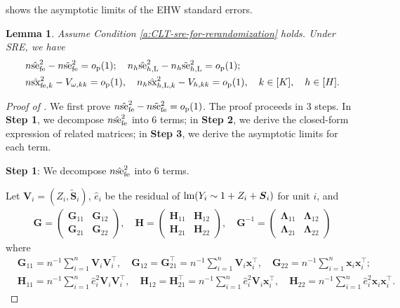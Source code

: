 \documentclass[12pt]{article}
\newtheorem{lemma}{Lemma}
\newcommand{\se}{\textnormal{se}}
\newcommand{\Lin}{\textnormal{L}}
\newcommand{\op}{o_{\textnormal{p}}}
\newcommand{\fe}{\textnormal{fe}}
\newcommand{\lm}{\textnormal{lm}}
\newcommand{\bs}{\boldsymbol}
\newcommand{\sx}{\textnormal{sx}}
\begin{document}
 shows the asymptotic limits of the EHW standard errors.
\begin{lemma}
\label{lem:limit-of-standard-errors}
Assume Condition \ref{a:CLT-sre-for-rerandomization} holds. Under SRE, we have
\begin{align*}
    &n\hat{\se}^2_{\fe } - n\tilde{\se}^2_{\fe } = \op(1);\quad  n_h\hat{\se}^2_{h,\Lin} - n_h\tilde{\se}^2_{h,\Lin} = \op(1); \\
    & n \hat{\sx}_{\fe ,k}^2 - V_{\omega,kk} = \op(1), \quad n_h \hat{\sx}_{h,\Lin,k}^2- V_{h,kk} = \op(1), \quad k \in [K],\quad h \in [H].\\
\end{align*}
\end{lemma}

\begin{proof}[Proof of ]
We first prove $n\hat{\se}^2_{\fe } - n\tilde{\se}^2_{\fe } = \op(1)$. The proof proceeds in $3$ steps. In \textbf{Step 1}, we decompose  $n\hat{\se}^2_{\fe }$ into $6$ terms;  in \textbf{Step 2}, we derive the closed-form expression of related matrices; in \textbf{Step 3}, we derive the asymptotic limits for each term.

\noindent \textbf{Step 1}: We decompose  $n\hat{\se}^2_{\fe }$ into $6$ terms.

    Let $\bs{V}_i = (Z_i,\tilde{\bs{S}}_i)$, $\hat{e}_i$ be the residual of $\lm(Y_i\sim 1+ Z_i + \bs{S}_i)$ for  unit $i$, and 
\begin{align*}
    \bs{G} = \begin{pmatrix}
        \bs{G}_{11} & \bs{G}_{12}\\
        \bs{G}_{21} & \bs{G}_{22}
    \end{pmatrix}, \quad \bs{H} = \begin{pmatrix}
        \bs{H}_{11} & \bs{H}_{12}\\
        \bs{H}_{21} & \bs{H}_{22}
    \end{pmatrix}, \quad \bs{G}^{-1} = \begin{pmatrix}
        \bs{\Lambda}_{11} & \bs{\Lambda}_{12}\\
        \bs{\Lambda}_{21} & \bs{\Lambda}_{22}
    \end{pmatrix}
\end{align*}
where
\begin{align*}
    &\bs{G}_{11} =  n^{-1} \sum_{i=1}^n \bs{V}_i\bs{V}_i^\top, \quad \bs{G}_{12} = \bs{G}_{21}^\top = n^{-1} \sum_{i=1}^n \bs{V}_i \bs{x}_i^\top, \quad \bs{G}_{22} = n^{-1} \sum_{i=1}^n \bs{x}_i \bs{x}_i^\top;\\
    &\bs{H}_{11} =  n^{-1} \sum_{i=1}^n \hat{e}_i^2\bs{V}_i\bs{V}_i^\top, \quad \bs{H}_{12} = \bs{H}_{21}^\top = n^{-1} \sum_{i=1}^n \hat{e}_i^2 \bs{V}_i \bs{x}_i^\top, \quad \bs{H}_{22} = n^{-1} \sum_{i=1}^n \hat{e}_i^2 \bs{x}_i \bs{x}_i^\top.
\end{align*}


\end{proof}
\end{document}
